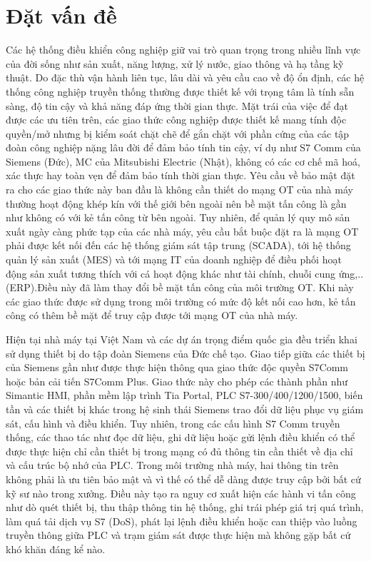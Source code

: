 \documentclass[../main.tex]{subfiles}
\begin{document}
\section{Đặt vấn đề}
\label{sec:dvd}

Các hệ thống điều khiển công nghiệp giữ vai trò quan trọng trong nhiều lĩnh vực của đời sống như sản xuất, năng lượng, xử lý nước, giao thông và hạ tầng kỹ thuật. Do đặc thù vận hành liên tục, lâu dài và yêu cầu cao về độ ổn định, các hệ thống công nghiệp truyền thống thường được thiết kế với trọng tâm là tính sẵn sàng, độ tin cậy và khả năng đáp ứng thời gian thực. Mặt trái của việc để đạt được các ưu tiên trên, các giao thức công nghiệp được thiết kế mang tính độc quyền/mở nhưng bị kiểm soát chặt chẽ để gắn chặt với phần cứng của các tập đoàn công nghiệp nặng lâu đời để đảm bảo tính tin cậy, ví dụ như S7 Comm của Siemens (Đức), MC của Mitsubishi Electric (Nhật), không có các cơ chế mã hoá, xác thực hay toàn vẹn để đảm bảo tính thời gian thực. Yêu cầu về bảo mật đặt ra cho các giao thức này ban đầu là không cần thiết do mạng OT của nhà máy thường hoạt động khép kín với thế giới bên ngoài nên bề mặt tấn công là gần như không có với kẻ tấn công từ bên ngoài. Tuy nhiên, để quản lý quy mô sản xuất ngày càng phức tạp của các nhà máy, yêu cầu bắt buộc đặt ra là mạng OT phải được kết nối đến các hệ thống giám sát tập trung (SCADA), tới hệ thống quản lý sản xuất (MES) và tới mạng IT của doanh nghiệp để điều phối hoạt động sản xuất tương thích với cá hoạt động khác như tài chính, chuỗi cung ứng,.. (ERP).Điều này đã làm thay đổi bề mặt tấn công của môi trường OT. Khi này các giao thức được sử dụng trong môi trường có mức độ kết nối cao hơn, kẻ tấn công có thêm bề mặt để truy cập được tới mạng OT của nhà máy.

Hiện tại nhà máy tại Việt Nam và các dự án trọng điểm quốc gia đều triển khai sử dụng thiết bị do tập đoàn Siemens của Đức chế tạo. Giao tiếp giữa các thiết bị của Siemens gần như được thực hiện thông qua giao thức độc quyền S7Comm hoặc bản cải tiến S7Comm Plus. Giao thức này cho phép các thành phần như Simantic HMI, phần mềm lập trình Tia Portal, PLC S7-300/400/1200/1500, biến tần và các thiết bị khác trong hệ sinh thái Siemens trao đổi dữ liệu phục vụ giám sát, cấu hình và điều khiển. Tuy nhiên, trong các cấu hình S7 Comm truyền thống, các thao tác như đọc dữ liệu, ghi dữ liệu hoặc gửi lệnh điều khiển có thể được thực hiện chỉ cần thiết bị trong mạng có đủ thông tin cần thiết về địa chỉ và cấu trúc bộ nhớ của PLC. Trong môi trường nhà máy, hai thông tin trên không phải là ưu tiên bảo mật và vì thế có thể dễ dàng được truy cập bởi bất cứ kỹ sư nào trong xưởng. Điều này tạo ra nguy cơ xuất hiện các hành vi tấn công như dò quét thiết bị, thu thập thông tin hệ thống, ghi trái phép giá trị quá trình, làm quá tải dịch vụ S7 (DoS), phát lại lệnh điều khiển hoặc can thiệp vào luồng truyền thông giữa PLC và trạm giám sát được thực hiện mà không gặp bất cứ khó khăn đáng kể nào.
\end{document}
